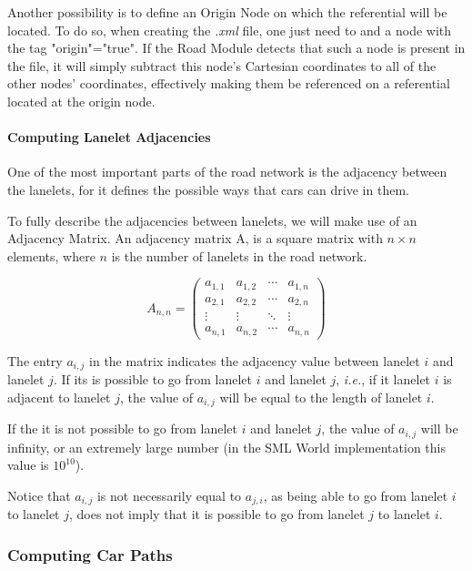 Another possibility is to define an Origin Node on which the referential will be located. To do so, when creating the \textit{.xml} file, one just need to and a node with the tag "origin"="true". If the Road Module detects that such a node is present in the file, it will simply subtract this node's Cartesian coordinates to all of the other nodes' coordinates, effectively making them be referenced on a referential located at the origin node.

\paragraph{Computing Lanelet Adjacencies}

One of the most important parts of the road network is the adjacency between the lanelets, for it defines the possible ways that cars can drive in them.

To fully describe the adjacencies between lanelets, we will make use of an Adjacency Matrix. An adjacency matrix A, is a square matrix with $n \times n$ elements, where $n$ is the number of lanelets in the road network.

\[
A_{n,n} = 
 \begin{pmatrix}
  a_{1,1} & a_{1,2} & \cdots & a_{1,n} \\
  a_{2,1} & a_{2,2} & \cdots & a_{2,n} \\
  \vdots  & \vdots  & \ddots & \vdots  \\
  a_{n,1} & a_{n,2} & \cdots & a_{n,n} 
 \end{pmatrix}
\]
 
The entry $a_{i,j}$ in the matrix indicates the adjacency value between lanelet $i$ and lanelet $j$. If its is possible to go from lanelet $i$ and lanelet $j$, \textit{i.e.}, if it lanelet $i$ is adjacent to lanelet $j$, the value of $a_{i,j}$ will be equal to the length of lanelet $i$.

If the it is not possible to go from lanelet $i$ and lanelet $j$, the value of $a_{i,j}$ will be infinity, or an extremely large number (in the SML World implementation this value is $10^{10}$).

Notice that $a_{i,j}$ is not necessarily equal to $a_{j,i}$, as being able to go from lanelet $i$ to lanelet $j$, does not imply that it is possible to go from lanelet $j$ to lanelet $i$.

\subsubsection{Computing Car Paths}

